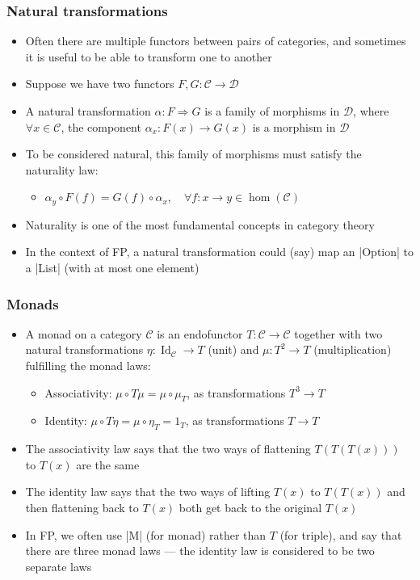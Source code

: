 \documentclass[mathserif,handout]{beamer}
\begin{document}
\begin{frame}[fragile]
  \frametitle{Natural transformations}
  \begin{itemize}
  \item Often there are multiple functors between pairs of categories, and sometimes it is useful to be able to transform one to another
  \item Suppose we have two functors $F,G: \mathcal{C}\longrightarrow\mathcal{D}$
  \item A \alert{natural transformation} $\alpha: F \Rightarrow G$ is a family of morphisms in $\mathcal{D}$, where $\forall x\in\mathcal{C}$, the \alert{component} $\alpha_x:F(x)\longrightarrow G(x)$ is a morphism in $\mathcal{D}$
  \item To be considered \alert{natural}, this family of morphisms must satisfy the \alert{naturality law}:
    \begin{itemize}
    \item $\alpha_y\circ F(f) = G(f)\circ \alpha_x,\quad \forall f: x\longrightarrow y \in \operatorname{hom}(\mathcal{C})$
    \end{itemize}
  \item \alert{Naturality} is one of the most fundamental concepts in category theory
    \item In the context of FP, a natural transformation could (say) map an |Option| to a |List| (with at most one element)
  \end{itemize}
\end{frame}

\begin{frame}[fragile]
  \frametitle{Monads}
  \begin{itemize}
  \item A \alert{monad} on a category $\mathcal{C}$ is an endofunctor $T: \mathcal{C}\longrightarrow\mathcal{C}$ together with two natural transformations $\eta: \operatorname{Id}_\mathcal{C} \longrightarrow T$ (\alert{unit}) and $\mu: T^2\longrightarrow T$ (\alert{multiplication}) fulfilling the \alert{monad laws}:
    \begin{itemize}
    \item \alert{Associativity}: $\mu \circ T\mu = \mu \circ \mu_T$, as transformations $T^3\longrightarrow T$
      \item \alert{Identity}: $\mu \circ T\eta = \mu\circ \eta_T = 1_T$, as transformations $T\longrightarrow T$
    \end{itemize}
  \item The associativity law says that the two ways of \alert{flattening} $T(T(T(x)))$ to $T(x)$ are the same
  \item The identity law says that the two ways of \alert{lifting} $T(x)$ to $T(T(x))$ and then flattening back to $T(x)$ both get back to the original $T(x)$
    \item In FP, we often use |M| (for monad) rather than $T$ (for triple), and say that there are three monad laws --- the identity law is considered to be two separate laws
  \end{itemize}
\end{frame}
\end{document}
